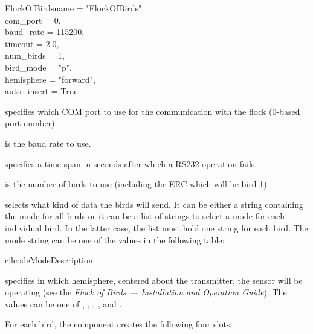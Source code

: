 \begin{classdesc}{FlockOfBirds}{name = "FlockOfBirds",\\ 
                                com_port = 0,\\
                                baud_rate = 115200,\\
                                timeout = 2.0,\\
                                num_birds = 1,\\
                                bird_mode = "p",\\
                                hemisphere = "forward",\\
                                auto_insert = True}


 specifies which COM port to use for the communication with
the flock (0-based port number).

 is the baud rate to use.

 specifies a time span in seconds after which a RS232 operation
fails.

 is the number of birds to use (including the ERC which will 
be bird 1).

 selects what kind of data the birds will send. It can be either
a string containing the mode for all birds or it can be a list of strings
to select a mode for each individual bird. In the latter case, the list must
hold one string for each bird. The mode string can be one of the values
in the following table:

\begin{tableii}{c|l}{code}{Mode}{Description}
\end{tableii}

 specifies in which hemisphere, centered about the
transmitter, the sensor will be operating (see the {\em Flock of Birds ---
Installation and Operation Guide}). The values can be one of ,
, , ,  and .

\end{classdesc}


For each bird, the  component creates the following
four slots:

